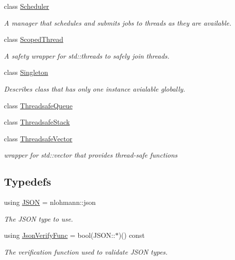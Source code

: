 \begin{DoxyCompactItemize}
class \hyperlink{classHatchit_1_1Core_1_1Scheduler}{Scheduler}
\begin{DoxyCompactList}\small\item\em A manager that schedules and submits jobs to threads as they are available. \end{DoxyCompactList}\item 
class \hyperlink{classHatchit_1_1Core_1_1ScopedThread}{Scoped\+Thread}
\begin{DoxyCompactList}\small\item\em A safety wrapper for std\+::threads to safely join threads. \end{DoxyCompactList}\item 
class \hyperlink{classHatchit_1_1Core_1_1Singleton}{Singleton}
\begin{DoxyCompactList}\small\item\em Describes class that has only one instance avialable globally. \end{DoxyCompactList}\item 
class \hyperlink{classHatchit_1_1Core_1_1ThreadsafeQueue}{Threadsafe\+Queue}
\item 
class \hyperlink{classHatchit_1_1Core_1_1ThreadsafeStack}{Threadsafe\+Stack}
\item 
class \hyperlink{classHatchit_1_1Core_1_1ThreadsafeVector}{Threadsafe\+Vector}
\begin{DoxyCompactList}\small\item\em wrapper for std\+::vector that provides thread-\/safe functions \end{DoxyCompactList}\end{DoxyCompactItemize}
\subsection*{Typedefs}
\begin{DoxyCompactItemize}
\item 
using \hyperlink{namespaceHatchit_1_1Core_a58a6350dd2a195178625a9f423a71b1c}{J\+S\+ON} = nlohmann\+::json\hypertarget{namespaceHatchit_1_1Core_a58a6350dd2a195178625a9f423a71b1c}{}\label{namespaceHatchit_1_1Core_a58a6350dd2a195178625a9f423a71b1c}

\begin{DoxyCompactList}\small\item\em The J\+S\+ON type to use. \end{DoxyCompactList}\item 
using \hyperlink{namespaceHatchit_1_1Core_a52c93242389bf919650beaae657e541f}{Json\+Verify\+Func} = bool(J\+S\+O\+N\+::$\ast$)() const\hypertarget{namespaceHatchit_1_1Core_a52c93242389bf919650beaae657e541f}{}\label{namespaceHatchit_1_1Core_a52c93242389bf919650beaae657e541f}

\begin{DoxyCompactList}\small\item\em The verification function used to validate J\+S\+ON types. \end{DoxyCompactList}\end{DoxyCompactItemize}
